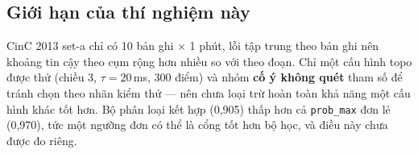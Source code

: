 \subsection{Giới hạn của thí nghiệm này}

CinC 2013 set-a chỉ có 10 bản ghi $\times$ 1 phút, lỗi tập trung theo bản ghi nên khoảng tin cậy theo cụm
rộng hơn nhiều so với theo đoạn. Chỉ một cấu hình topo được thử (chiều 3, $\tau = 20$\,ms, 300 điểm) và
nhóm \textbf{cố ý không quét} tham số để tránh chọn theo nhãn kiểm thử --- nên chưa loại trừ hoàn toàn
khả năng một cấu hình khác tốt hơn. Bộ phân loại kết hợp (0,905) thấp hơn cả \texttt{prob\_max} đơn lẻ
(0,970), tức một ngưỡng đơn có thể là cổng tốt hơn bộ học, và điều này chưa được đo riêng.
